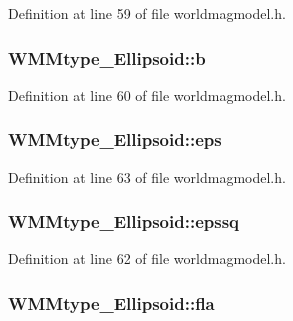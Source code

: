 Definition at line 59 of file worldmagmodel.\-h.

\hypertarget{struct_w_m_mtype___ellipsoid_a700f1bab0f80706ecc671bdbb000a0a6}{
\subsubsection[{b}]{ W\-M\-Mtype\-\_\-\-Ellipsoid\-::b}}\label{struct_w_m_mtype___ellipsoid_a700f1bab0f80706ecc671bdbb000a0a6}


Definition at line 60 of file worldmagmodel.\-h.

\hypertarget{struct_w_m_mtype___ellipsoid_a294084e52ea367c0e1cd4ed78a7cb29d}{
\subsubsection[{eps}]{ W\-M\-Mtype\-\_\-\-Ellipsoid\-::eps}}\label{struct_w_m_mtype___ellipsoid_a294084e52ea367c0e1cd4ed78a7cb29d}


Definition at line 63 of file worldmagmodel.\-h.

\hypertarget{struct_w_m_mtype___ellipsoid_ab21d8812b21bf6481a495af07bc746ee}{
\subsubsection[{epssq}]{ W\-M\-Mtype\-\_\-\-Ellipsoid\-::epssq}}\label{struct_w_m_mtype___ellipsoid_ab21d8812b21bf6481a495af07bc746ee}


Definition at line 62 of file worldmagmodel.\-h.

\hypertarget{struct_w_m_mtype___ellipsoid_a001bda565c83d57cf057d66dcc6f92ea}{
\subsubsection[{fla}]{ W\-M\-Mtype\-\_\-\-Ellipsoid\-::fla}}\label{struct_w_m_mtype___ellipsoid_a001bda565c83d57cf057d66dcc6f92ea}


